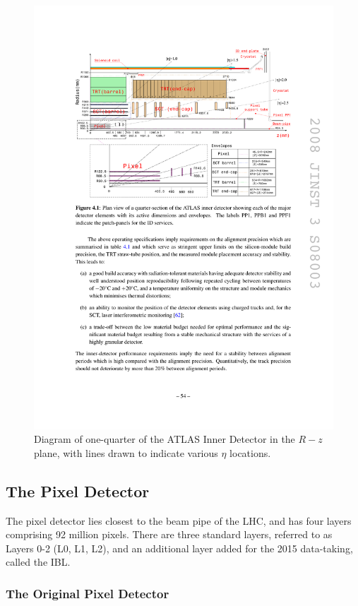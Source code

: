 \begin{centering}
\begin{figure}[bth]
\myfloatalign
\includegraphics[width=.90\linewidth]{figures/atlas/ideta.pdf}
\caption{Diagram of one-quarter of the ATLAS Inner Detector in the $R-z$ plane, with lines drawn to indicate various $\eta$ locations.}
\label{fig:IDeta}
\end{figure}
\end{centering}

\subsection{The Pixel Detector}

The pixel detector lies closest to the beam pipe of the \ac{LHC}, and has four layers comprising 92 million pixels. There are three standard layers, referred to as Layers 0-2 (L0, L1, L2), and an additional layer added for the 2015 data-taking, called the \ac{IBL}. 

\subsubsection{The Original Pixel Detector}

